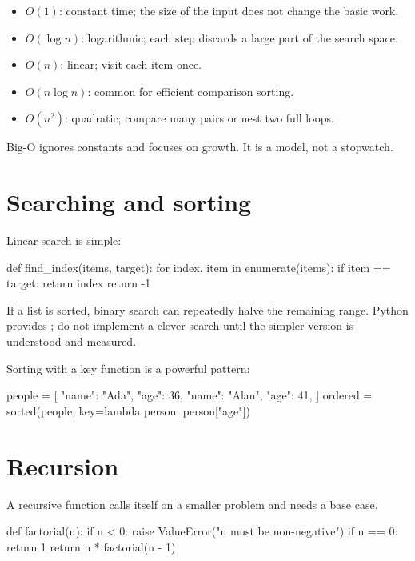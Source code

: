 \documentclass[11pt,openany,oneside]{book}
\newcommand{\inlinecode}[1]{\texttt{\small\detokenize{#1}}}
\begin{document}
\begin{itemize}
  \item $O(1)$: constant time; the size of the input does not change the basic work.
  \item $O(\log n)$: logarithmic; each step discards a large part of the search space.
  \item $O(n)$: linear; visit each item once.
  \item $O(n \log n)$: common for efficient comparison sorting.
  \item $O(n^2)$: quadratic; compare many pairs or nest two full loops.
\end{itemize}

Big-O ignores constants and focuses on growth. It is a model, not a stopwatch.

\section{Searching and sorting}

Linear search is simple:

\begin{code}[language=Python]
def find_index(items, target):
    for index, item in enumerate(items):
        if item == target:
            return index
    return -1
\end{code}

If a list is sorted, binary search can repeatedly halve the remaining range. Python provides \inlinecode{bisect}; do not implement a clever search until the simpler version is understood and measured.

Sorting with a key function is a powerful pattern:

\begin{code}[language=Python]
people = [
    {"name": "Ada", "age": 36},
    {"name": "Alan", "age": 41},
]
ordered = sorted(people, key=lambda person: person["age"])
\end{code}

\section{Recursion}

A recursive function calls itself on a smaller problem and needs a base case.

\begin{code}[language=Python]
def factorial(n):
    if n < 0:
        raise ValueError("n must be non-negative")
    if n == 0:
        return 1
    return n * factorial(n - 1)
\end{code}
\end{document}
